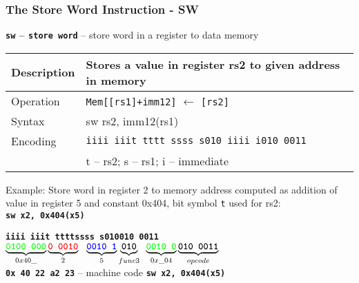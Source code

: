 \documentclass{beamer}
\begin{document}
\begin{frame}
\frametitle{The Store Word Instruction - SW}

\textbf{\texttt{sw} -- \texttt{store word}} --  store word in a register to data memory

\bigskip

\begin{tabular}{|l|l|}\hline
Description & Stores a value in register rs2 to given address in memory \\ \hline
Operation& \texttt{Mem[[rs1]+imm12]} $\leftarrow$ \texttt{[rs2]} \\ \hline
Syntax & sw rs2, imm12(rs1) \\ \hline
Encoding & \texttt{iiii iiit tttt ssss s010 iiii i010 0011} \\
 & t -- rs2; s -- rs1; i -- immediate \\ \hline
\end{tabular}

\bigskip

Example: Store word in register 2 to memory address computed as addition of value in register 5 and constant 0x404, bit symbol \texttt{t} used for rs2:\\
\textbf{\texttt{sw x2, 0x404(x5)}}

\textbf{\texttt{{\color{green}iiii iii}\hspace{0.08cm}\color{red}t tttt}}\phantom{x}\hspace{0.13cm}\textbf{\texttt{\color{blue}ssss s}}\hspace{0.1cm}\textbf{\texttt{010\hspace{0.05cm}010 0011}}\\
$\underbrace{\textbf{\texttt{\color{green}0100 000}}}_{0x40\_}
\underbrace{\textbf{\texttt{\color{red}0 0010}}}_{2}
\texttt{ }\underbrace{\textbf{\texttt{\color{blue}0010 1}}}_{5}
\underbrace{\textbf{\texttt{010}}}_{func3}\phantom{i}\underbrace{\textbf{\texttt{\color{green}0010 0}}}_{0x \_04}
\underbrace{\textbf{\texttt{010 0011}}}_{opcode}$\\

\textbf{\texttt{0x 40 22 a2 23}} -- machine code \textbf{\texttt{sw x2, 0x404(x5)}}

\end{frame}
\end{document}
